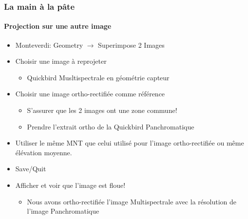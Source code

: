 \documentclass[compress,handout]{beamer}
\begin{document}
\begin{frame}
  \frametitle{La main à la pâte}
  \framesubtitle{Projection sur une autre image}
  \begin{itemize}
  \item Monteverdi: Geometry $\rightarrow$ Superimpose 2 Images
  \item Choisir une image à reprojeter
    \begin{itemize}
    \item Quickbird Musltispectrale en géométrie capteur
    \end{itemize}
  \item Choisir une image ortho-rectifiée comme référence
    \begin{itemize}
    \item S'assurer que les 2 images ont une zone commune!
    \item Prendre l'extrait ortho de la Quickbird Panchromatique
    \end{itemize}
  \item Utiliser le même MNT que celui utilisé pour l'image
    ortho-rectifiée ou même élévation moyenne.
  \item Save/Quit
  \item Afficher et voir que l'image est floue!
    \begin{itemize}
    \item Nous avons ortho-rectifiée l'image Multispectrale avec la
      résolution de l'image Panchromatique
    \end{itemize}
  \end{itemize}
\end{frame}
\end{document}

